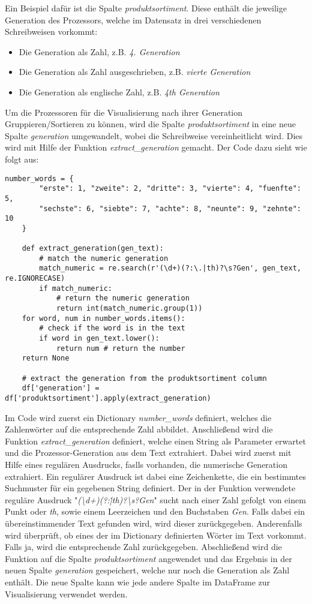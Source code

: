 Ein Beispiel dafür ist die Spalte \textit{produktsortiment}. Diese enthält die jeweilige Generation des Prozessors, welche im Datensatz in drei verschiedenen
Schreibweisen vorkommt:
\begin{itemize}
    \item Die Generation als Zahl, z.B. \textit{4. Generation}
    \item Die Generation als Zahl ausgeschrieben, z.B. \textit{vierte Generation}
    \item Die Generation als englische Zahl, z.B. \textit{4th Generation}
\end{itemize}
Um die Prozessoren für die Visualisierung nach ihrer Generation Gruppieren/Sortieren zu können, wird die Spalte \textit{produktsortiment}
in eine neue Spalte \textit{generation} umgewandelt, wobei die Schreibweise vereinheitlicht wird. Dies wird mit Hilfe der Funktion \textit{extract\_generation}
gemacht. Der Code dazu sieht wie folgt aus:
\begin{lstlisting}[caption={\texttt{Funktion extraxct\_generation}},captionpos=b]
    number_words = {
        "erste": 1, "zweite": 2, "dritte": 3, "vierte": 4, "fuenfte": 5,
        "sechste": 6, "siebte": 7, "achte": 8, "neunte": 9, "zehnte": 10
    }

    def extract_generation(gen_text):
        # match the numeric generation
        match_numeric = re.search(r'(\d+)(?:\.|th)?\s?Gen', gen_text, re.IGNORECASE)
        if match_numeric:
            # return the numeric generation
            return int(match_numeric.group(1))
    for word, num in number_words.items():
        # check if the word is in the text
        if word in gen_text.lower(): 
            return num # return the number
    return None

    # extract the generation from the produktsortiment column
    df['generation'] = df['produktsortiment'].apply(extract_generation) 
\end{lstlisting}

Im Code wird zuerst ein Dictionary \textit{number\_words} definiert, welches die Zahlenwörter auf die entsprechende Zahl abbildet.
Anschließend wird die Funktion \textit{extract\_generation} definiert, welche einen String als Parameter erwartet und die Prozessor-Generation aus dem Text extrahiert.
Dabei wird zuerst mit Hilfe eines regulären Ausdrucks, faslls vorhanden, die numerische Generation extrahiert. Ein regulärer Ausdruck ist dabei eine Zeichenkette,
die ein bestimmtes Suchmuster für ein gegebenen String definiert.
Der in der Funktion verwendete reguläre Ausdruck "\textit{(\textbackslash d+)(?:\.|th)?\textbackslash s?Gen}" sucht nach einer Zahl gefolgt von einem Punkt oder \textit{th},
sowie einem Leerzeichen und den Buchstaben \textit{Gen}. Falls dabei ein übereinstimmender Text gefunden wird, wird dieser zurückgegeben. Anderenfalls wird
überprüft, ob eines der im Dictionary definierten Wörter im Text vorkommt. Falls ja, wird die entsprechende Zahl zurückgegeben.
Abschließend wird die Funktion auf die Spalte \textit{produktsortiment} angewendet und das Ergebnis in der neuen Spalte \textit{generation} gespeichert, welche nur noch die
Generation als Zahl enthält.
Die neue Spalte kann wie jede andere Spalte im DataFrame zur Visualisierung verwendet werden.

